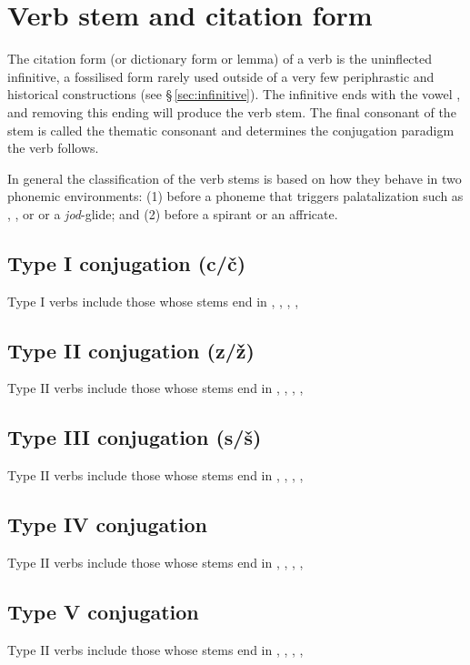 \section{Verb stem and citation form}

\par The {\sc citation form} (or {\sc dictionary form} or {\sc lemma}) of a verb is the uninflected {\sc infinitive}, a fossilised form rarely used outside of a very few periphrastic and historical constructions (see \S\,\ref{sec:infinitive}). The infinitive ends with the vowel , and removing this ending will produce the verb stem. The final consonant  of the stem is called the thematic consonant and determines the conjugation paradigm the verb follows.

In general the classification of the verb stems is based on how they behave in two phonemic environments: (1) before a phoneme that triggers palatalization such as , ,  or  or a \emph{jod}-glide; and (2) before a spirant or an affricate.

\subsection{Type I conjugation (c/č)}
Type I verbs include those whose stems end in , , , ,

\subsection{Type II conjugation (z/ž)}
Type II verbs include those whose stems end in , , , ,

\subsection{Type III conjugation (s/š)}
Type II verbs include those whose stems end in , , , ,

\subsection{Type IV conjugation}
Type II verbs include those whose stems end in , , , ,

\subsection{Type V conjugation}
Type II verbs include those whose stems end in , , , ,


